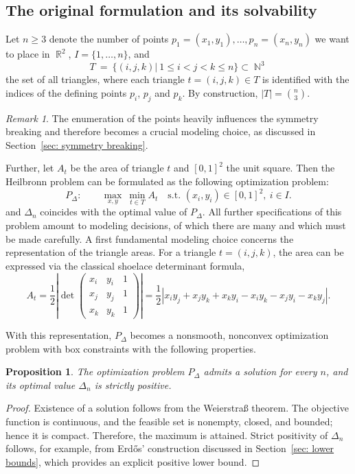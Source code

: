 \documentclass[11pt,a4paper]{article}
\theoremstyle{plain}
\newtheorem{proposition}{Proposition}
\theoremstyle{definition}
\theoremstyle{remark}
\newtheorem{remark}{Remark}
\DeclareMathOperator{\N}{\mathbb{N}}
\DeclareMathOperator{\R}{\mathbb{R}}
\begin{document}
\subsection{The original formulation and its solvability}\label{sec:original formulation}

Let $n\ge 3$ denote the number of points $p_1=(x_1,y_1),\ldots,p_n=(x_n,y_n)$ we want to place in $\R^2$, $I=\{1,\ldots,n\}$, and 
\[
T\ =\ \{(i,j,k)|\ 1\le i<j<k\le n\}\subset \N^3
\]
the set of all triangles, where each triangle $t=(i,j,k)\in T$ is identified with the indices of the defining points $p_i$, $p_j$ and $p_k$.
By construction, $|T|=\binom{n}{3}$.
\begin{remark}
  The enumeration of the points heavily influences the symmetry breaking and therefore 
   becomes a crucial modeling choice, as discussed in Section~\ref{sec: symmetry breaking}.
\end{remark}

Further, let $A_t$ be the area of triangle $t$ and $[0,1]^2$ the unit square. Then the Heilbronn problem can be formulated as the following optimization problem:
\[
P_\Delta:\qquad
\max_{x,y}\ \min_{t\in T} A_t
\quad
\text{s.t. } (x_i,y_i)\in[0,1]^2,\ i\in I.
\]
and $\Delta_n$ coincides with the optimal value of $P_\Delta$.
All further specifications of this problem amount to modeling decisions, of which there are many and which must be made carefully. A first fundamental modeling choice concerns the representation of the triangle areas. 
For a triangle $t=(i,j,k)$, the area can be expressed via the classical shoelace determinant formula,
\[
A_t
= \frac{1}{2}\left|\det
\begin{pmatrix}
x_i & y_i & 1\\
x_j & y_j & 1\\
x_k & y_k & 1
\end{pmatrix}
\right|
=
\frac{1}{2}
\left|
x_i y_j + x_j y_k + x_k y_i
-
x_i y_k - x_j y_i - x_k y_j
\right|.
\]

With this representation, $P_\Delta$ becomes a nonsmooth, nonconvex optimization problem with box constraints with the following properties.

\begin{proposition}\label{prop:solvability-positive-optval}
  The optimization problem $P_\Delta$ admits a solution for every $n$, and its optimal value $\Delta_n$ is strictly positive.
  \end{proposition}
  
  \begin{proof}
  Existence of a solution follows from the Weierstraß theorem. 
  The objective function is continuous, and the feasible set is nonempty, closed, and bounded; hence it is compact. 
  Therefore, the maximum is attained. Strict positivity of $\Delta_n$ follows, for example, from Erd\H{o}s' construction discussed in Section~\ref{sec: lower bounds}, which provides an explicit positive lower bound.
  \end{proof}
  
\end{document}

